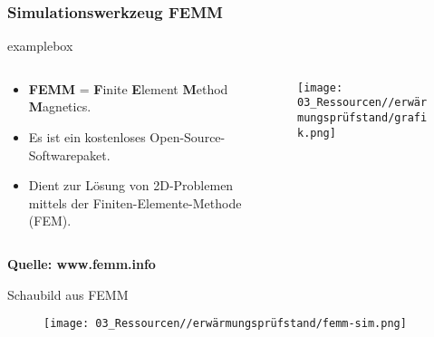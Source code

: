 \begin{frame}
    \frametitle{Simulationswerkzeug FEMM}
    \begin{beamercolorbox}[wd=\textwidth, sep=1ex, rounded=true, shadow=true]{examplebox}
        \begin{columns}[c]
            \begin{column}{0.45\textwidth}
                \begin{itemize}
                    \item \textbf{FEMM} = \textbf{F}inite \textbf{E}lement \textbf{M}ethod \textbf{M}agnetics.
                    \item Es ist ein kostenloses Open-Source-Softwarepaket.
                    \item Dient zur Lösung von 2D-Problemen mittels der Finiten-Elemente-Methode (FEM).
                \end{itemize}
            \end{column}
            \begin{column}{0.5\textwidth}
                \begin{figure}
                    \centering
                    \texttt{[image: 03\_Ressourcen//erwärmungsprüfstand/grafik.png]}
                \end{figure}
            \end{column}
        \end{columns}
        \centering
        \textbf{Quelle: www.femm.info}
    \end{beamercolorbox}
\end{frame}

\begin{frame}{Schaubild aus FEMM}
    \begin{figure}
        \centering
        \texttt{[image: 03\_Ressourcen//erwärmungsprüfstand/femm-sim.png]}
    \end{figure}
\end{frame}







